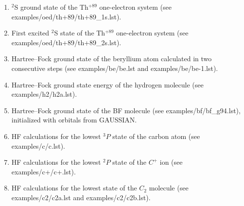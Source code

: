 \documentclass[12pt,a4paper]{article}
\begin{document}
\begin{enumerate}

\item $^2$S ground state of the Th$^{+89}$ one-electron system (see
  {examples/\-oed/\-th+89/\-th+89\-\_1s.\-lst}).





\item First excited $^2$S state of the Th$^{+89}$ one-electron
  system (see {examples/\-oed/\-th+89/\-th+89\-\_2s.\-lst}).



\newpage

\item \label{example-be} Hartree--Fock ground state of the beryllium atom calculated in
  two consecutive steps (see examples/\-be/\-be.lst and examples/\-be/\-be-1.lst).







\newpage


\item Hartree--Fock ground state energy of the hydrogen molecule (see
  examples/h2/h2a.lst).



\item \label{example-bf} Hartree--Fock ground state of the BF molecule (see
  examples/bf/bf\_g94.lst), initialized with orbitals from GAUSSIAN.



\newpage
\item HF calculations for the lowest $^3P$ state of the carbon atom
  (see examples/c/c.lst).



\item HF calculations for the lowest $^2P$ state of the $C^+$ ion (see
  examples/c+/c+.lst).



\newpage
\item \label{example-c2a} HF calculations for the lowest state of the $C_2$ molecule (see
  examples/c2/c2a.lst and examples/c2/c2b.lst).




\end{enumerate}
\end{document}
